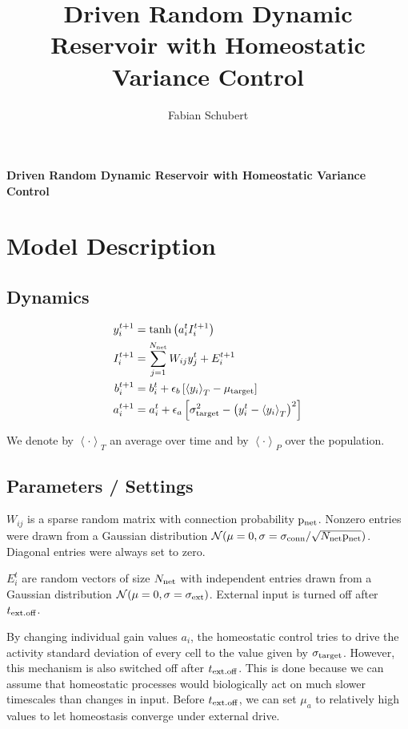 \documentclass[10pt,a4paper]{article}
\author{Fabian Schubert}
\title{Driven Random Dynamic Reservoir with Homeostatic Variance Control}
\newcommand{\avgt}[1]{\left< #1 \right>_T}
\newcommand{\avgp}[1]{\left< #1 \right>_P}
\begin{document}
\begin{center}
\begin{LARGE}
\textbf{Driven Random Dynamic Reservoir with Homeostatic Variance Control}\\
\end{LARGE}
\end{center}

\section{Model Description}

\subsection{Dynamics}
\begin{align}
y_i^{t+1} &= \mathrm{tanh}\left( a_i^t I_i^{t+1} \right) \label{eq:reserv_dynamics}\\
I_i^{t+1} &= \sum_{j=1}^{N_{\rm net}} W_{ij} y_j^t + E_i^{t+1} \label{eq:input_dynamics} \\
b_i^{t+1} &= b_i^t + \epsilon_{b} \left[ \avgt{y_i} - \mu_{\rm target} \right] \\
a_i^{t+1} &= a_i^{t} + \epsilon_{a} \left[ \sigma_{\rm target}^2 - \left( y_i^t - \avgt{y_i}\right)^2 \right] \label{eq:gain_dynamcis}
\end{align}

We denote by $\avgt{\cdot}$ an average over time and by $\avgp{\cdot}$ over the population.

\subsection{Parameters / Settings}

$W_{ij}$ is a sparse random matrix with connection probability ${\rm p_{net}}$. Nonzero entries were drawn from a Gaussian distribution $\mathcal{N}(\mu = 0,\sigma = \sigma_{\rm conn} / \sqrt{N_{\rm net} {\rm p_{net}}})$. Diagonal entries were always set to zero.

$E^t_{i}$ are random vectors of size $N_{\rm net}$ with independent entries drawn from a Gaussian distribution $\mathcal{N}(\mu = 0,\sigma = \sigma_{\rm ext})$. External input is turned off after $t_{\rm ext.off}$.

By changing individual gain values $a_i$, the homeostatic control tries to drive the activity standard deviation of every cell to the value given by $\sigma_{\rm target}$. However, this mechanism is also switched off after $t_{\rm ext.off}$. This is done because we can assume that homeostatic processes would biologically act on much slower timescales than changes in input. Before $t_{\rm ext.off}$, we can set $\mu_{a}$ to relatively high values to let homeostasis converge under external drive.
\end{document}
